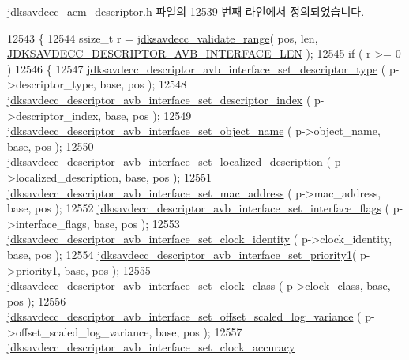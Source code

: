 jdksavdecc\+\_\+aem\+\_\+descriptor.\+h 파일의 12539 번째 라인에서 정의되었습니다.


\begin{DoxyCode}
12543 \{
12544     ssize\_t r = \hyperlink{group__util_ga9c02bdfe76c69163647c3196db7a73a1}{jdksavdecc\_validate\_range}( pos, len, 
      \hyperlink{group__descriptor__avb__interface_gaa0de60188c16df7f04fbc87d490112bc}{JDKSAVDECC\_DESCRIPTOR\_AVB\_INTERFACE\_LEN} );
12545     \textcolor{keywordflow}{if} ( r >= 0 )
12546     \{
12547         \hyperlink{group__descriptor__avb__interface_ga3d003a2b8e5f29cefdcc60ad35d45aae}{jdksavdecc\_descriptor\_avb\_interface\_set\_descriptor\_type}
      ( p->descriptor\_type, base, pos );
12548         \hyperlink{group__descriptor__avb__interface_gad49d78b1b367aa029466ed34863ad480}{jdksavdecc\_descriptor\_avb\_interface\_set\_descriptor\_index}
      ( p->descriptor\_index, base, pos );
12549         \hyperlink{group__descriptor__avb__interface_ga726447a0fd154e4b5d5487e308c915aa}{jdksavdecc\_descriptor\_avb\_interface\_set\_object\_name}
      ( p->object\_name, base, pos );
12550         \hyperlink{group__descriptor__avb__interface_ga858ae013ca91a5aa98b59ccd67ecdeeb}{jdksavdecc\_descriptor\_avb\_interface\_set\_localized\_description}
      ( p->localized\_description, base, pos );
12551         \hyperlink{group__descriptor__avb__interface_gaade556b8bbb92d3ddd58474d4e7e1d74}{jdksavdecc\_descriptor\_avb\_interface\_set\_mac\_address}
      ( p->mac\_address, base, pos );
12552         \hyperlink{group__descriptor__avb__interface_ga9721f91ed03967331e70423a59900a4c}{jdksavdecc\_descriptor\_avb\_interface\_set\_interface\_flags}
      ( p->interface\_flags, base, pos );
12553         \hyperlink{group__descriptor__avb__interface_ga3a5dacedaf57fbb5ecce46650e917b12}{jdksavdecc\_descriptor\_avb\_interface\_set\_clock\_identity}
      ( p->clock\_identity, base, pos );
12554         \hyperlink{group__descriptor__avb__interface_gaa4d33cfc4fb1754a9cdb2e1385311d88}{jdksavdecc\_descriptor\_avb\_interface\_set\_priority1}(
       p->priority1, base, pos );
12555         \hyperlink{group__descriptor__avb__interface_ga892bbe1945ab01425e30b366ef8c3a21}{jdksavdecc\_descriptor\_avb\_interface\_set\_clock\_class}
      ( p->clock\_class, base, pos );
12556         \hyperlink{group__descriptor__avb__interface_ga163f4e08eb77026f3c93eabd9efbd5a5}{jdksavdecc\_descriptor\_avb\_interface\_set\_offset\_scaled\_log\_variance}
      ( p->offset\_scaled\_log\_variance, base, pos );
12557         \hyperlink{group__descriptor__avb__interface_ga717343484db4c8c6f0de57dc7025a2fa}{jdksavdecc\_descriptor\_avb\_interface\_set\_clock\_accuracy}

\end{DoxyCode}
